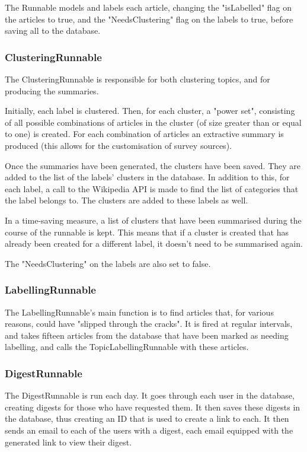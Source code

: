 \documentclass[12pt]{article}
\begin{document}
The Runnable models and labels each article, changing the "isLabelled" flag on the articles to true, and the "NeedsClustering" flag on the labels to true, before saving all to the database. 

\subsubsection{ClusteringRunnable}

The ClusteringRunnable is responsible for both clustering topics, and for producing the summaries. 

Initially, each label is clustered. Then, for each cluster, a "power set", consisting of all possible combinations of articles in the cluster (of size greater than or equal to one) is created. For each combination of articles an extractive summary is produced (this allows for the customisation of survey sources). 

Once the summaries have been generated, the clusters have been saved. They are added to the list of the labels' clusters in the database. In addition to this, for each label, a call to the Wikipedia API is made to find the list of categories that the label belongs to. The clusters are added to these labels as well.

In a time-saving measure, a list of clusters that have been summarised during the course of the runnable is kept. This means that if a cluster is created that has already been created for a different label, it doesn't need to be summarised again.

The "NeedsClustering" on the labels are also set to false.

\subsubsection{LabellingRunnable}

The LabellingRunnable's main function is to find articles that, for various reasons, could have "slipped through the cracks". It is fired at regular intervals, and takes fifteen articles from the database that have been marked as needing labelling, and calls the TopicLabellingRunnable with these articles.

\subsubsection{DigestRunnable}

The DigestRunnable is run each day. It goes through each user in the database, creating digests for those who have requested them. It then saves these digests in the database, thus creating an ID that is used to create a link to each. It then sends an email to each of the users with a digest, each email equipped with the generated link to view their digest.
\end{document}

